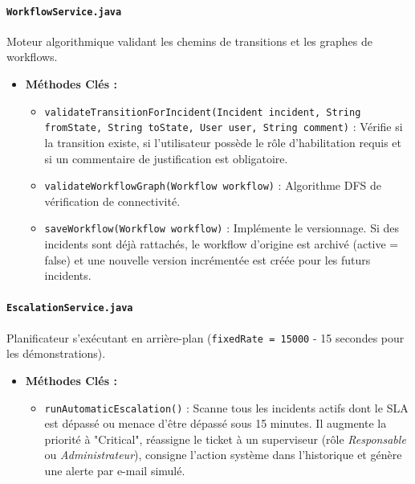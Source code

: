 \documentclass[12pt,a4paper]{article}
\begin{document}
\paragraph{\texttt{WorkflowService.java}}
Moteur algorithmique validant les chemins de transitions et les graphes de workflows.
\begin{itemize}
    \item \textbf{Méthodes Clés :}
        \begin{itemize}
            \item \texttt{validateTransitionForIncident(Incident incident, String fromState, String toState, User user, String comment)} : Vérifie si la transition existe, si l'utilisateur possède le rôle d'habilitation requis et si un commentaire de justification est obligatoire.
            \item \texttt{validateWorkflowGraph(Workflow workflow)} : Algorithme DFS de vérification de connectivité.
            \item \texttt{saveWorkflow(Workflow workflow)} : Implémente le versionnage. Si des incidents sont déjà rattachés, le workflow d'origine est archivé (active = false) et une nouvelle version incrémentée est créée pour les futurs incidents.
        \end{itemize}
\end{itemize}

\paragraph{\texttt{EscalationService.java}}
Planificateur s'exécutant en arrière-plan (\texttt{fixedRate = 15000} - 15 secondes pour les démonstrations).
\begin{itemize}
    \item \textbf{Méthodes Clés :}
        \begin{itemize}
            \item \texttt{runAutomaticEscalation()} : Scanne tous les incidents actifs dont le SLA est dépassé ou menace d'être dépassé sous 15 minutes. Il augmente la priorité à "Critical", réassigne le ticket à un superviseur (rôle \textit{Responsable} ou \textit{Administrateur}), consigne l'action système dans l'historique et génère une alerte par e-mail simulé.
        \end{itemize}
\end{itemize}

\clearpage

\end{document}
